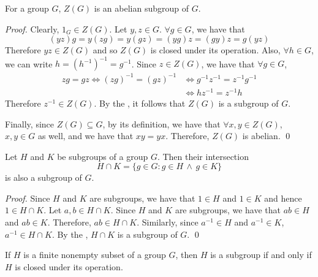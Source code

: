 \begin{eg}
  For a group $G$, $Z(G)$ is an abelian subgroup of $G$.

  \begin{proof}
    Clearly, $1_G \in Z(G)$. Let $y, z \in G$. $\forall g \in G$, we have that
    \begin{equation*}
      (yz)g = y(zg) = y(gz) = (yg)z = (gy)z = g(yz)
    \end{equation*}
    Therefore $yz \in Z(G)$ and so $Z(G)$ is closed under its operation. Also, $\forall h \in G$, we can write $h = (h^{-1})^{-1} = g^{-1}$. Since $z \in Z(G)$, we have that $\forall g \in G$,
    \begin{align*}
      zg = gz \iff (zg)^{-1} = (gz)^{-1} &\iff g^{-1} z^{-1} = z^{-1} g^{-1} \\
          &\iff hz^{-1} = z^{-1} h
    \end{align*}
    Therefore $z^{-1} \in Z(G)$. By the , it follows that $Z(G)$ is a subgroup of $G$.

    Finally, since $Z(G) \subseteq G$, by its definition, we have that $\forall x, y \in Z(G)$, $x, y \in G$ as well, and we have that $xy = yx$. Therefore, $Z(G)$ is abelian. \qed
  \end{proof}
\end{eg}

\begin{propo}\label{propo:intersection_of_subgroups_is_a_subgroup}
  Let $H$ and $K$ be subgroups of a group $G$. Then their intersection
  \begin{equation*}
    H \cap K = \{g \in G : g \in H \, \land \, g \in K\}
  \end{equation*}
  is also a subgroup of $G$.
\end{propo}

\begin{proof}
  Since $H$ and $K$ are subgroups, we have that $1 \in H$ and $1 \in K$ and hence $1 \in H \cap K$. Let $a, b \in H \cap K$. Since $H$ and $K$ are subgroups, we have that $ab \in H$ and $ab \in K$. Therefore, $ab \in H \cap K$. Similarly, since $a^{-1} \in H$ and $a^{-1} \in K$, $a^{-1} \in H \cap K$. By the , $H \cap K$ is a subgroup of $G$. \qed
\end{proof}

\begin{propo}\label{propo:finite_subgroup_test}
  If $H$ is a finite nonempty subset of a group $G$, then $H$ is a subgroup if and only if $H$ is closed under its operation.
\end{propo}

